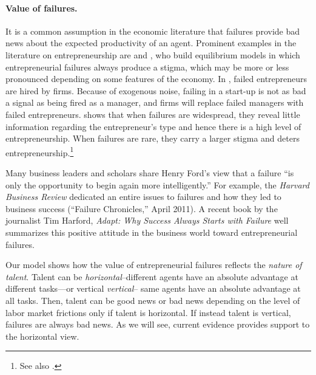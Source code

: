 \documentclass[12pt,american]{paper}
\theoremstyle{remark}
\begin{document}
\paragraph{Value of failures.}
It is a common assumption in the economic literature that failures provide bad news about the expected productivity of an agent. Prominent examples in the literature on entrepreneurship are \citet{gromb_entrepreneurship_2002} and \citet{landier_entrepreneurship_2005}, who build equilibrium models in which entrepreneurial failures always produce a stigma, which may be more or less pronounced depending on some features of the economy.
In \citet*{gromb_entrepreneurship_2002}, failed entrepreneurs are hired by firms. Because of exogenous noise, failing in a start-up is not as bad a signal as being fired as a manager, and firms will replace failed managers with failed entrepreneurs. \citet{landier_entrepreneurship_2005} shows that when failures are widespread, they reveal little information regarding the entrepreneur's type and hence there is a high level of entrepreneurship. When failures are rare, they carry a larger stigma and deters entrepreneurship.\footnote{See also \citet*{schumacher2015entrepreneurial}.}

Many business leaders and scholars share Henry Ford's view that a failure ``is only the opportunity to begin again more intelligently.'' For example, the \emph{Harvard Business Review} dedicated an entire issues to failures and how they led to business success (``Failure Chronicles,'' April 2011). A recent book by the journalist Tim Harford, \emph{Adapt: Why Success Always Starts with Failure} well summarizes this positive attitude in the business world toward entrepreneurial failures.

Our model shows how the value of entrepreneurial failures reflects the \textit{nature of talent}. Talent can be \emph{horizontal}--different agents have an absolute advantage at different tasks---or vertical \emph{vertical}-- same agents have an absolute advantage at all tasks. Then, talent can be good news or bad news depending on the level of labor market frictions only if talent is horizontal. If instead talent is vertical, failures are always bad news. As we will see, current evidence provides support to the horizontal view. 


\end{document}
